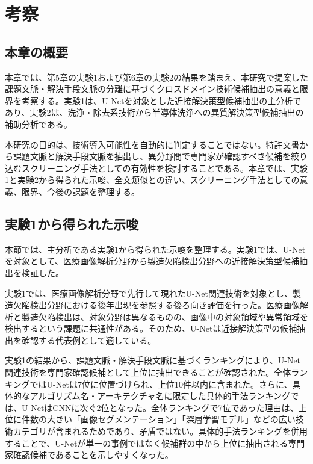 \chapter{考察}

\section{本章の概要}

本章では、第5章の実験1および第6章の実験2の結果を踏まえ、本研究で提案した課題文脈・解決手段文脈の分離に基づくクロスドメイン技術候補抽出の意義と限界を考察する。実験1は、U-Netを対象とした近接解決策型候補抽出の主分析であり、実験2は、洗浄・除去系技術から半導体洗浄への異質解決策型候補抽出の補助分析である。

本研究の目的は、技術導入可能性を自動的に判定することではない。特許文書から課題文脈と解決手段文脈を抽出し、異分野間で専門家が確認すべき候補を絞り込むスクリーニング手法としての有効性を検討することである。本章では、実験1と実験2から得られた示唆、全文類似との違い、スクリーニング手法としての意義、限界、今後の課題を整理する。

\section{実験1から得られた示唆}




本節では、主分析である実験1から得られた示唆を整理する。実験1では、U-Netを対象として、医療画像解析分野から製造欠陥検出分野への近接解決策型候補抽出を検証した。

実験1では、医療画像解析分野で先行して現れたU-Net関連技術を対象とし、製造欠陥検出分野における後年出現を参照する後ろ向き評価を行った。医療画像解析と製造欠陥検出は、対象分野は異なるものの、画像中の対象領域や異常領域を検出するという課題に共通性がある。そのため、U-Netは近接解決策型の候補抽出を確認する代表例として適している。

実験1の結果から、課題文脈・解決手段文脈に基づくランキングにより、U-Net関連技術を専門家確認候補として上位に抽出できることが確認された。全体ランキングではU-Netは7位に位置づけられ、上位10件以内に含まれた。さらに、具体的なアルゴリズム名・アーキテクチャ名に限定した具体的手法ランキングでは、U-NetはCNNに次ぐ2位となった。全体ランキングで7位であった理由は、上位に件数の大きい「画像セグメンテーション」「深層学習モデル」などの広い技術カテゴリが含まれるためであり、矛盾ではない。具体的手法ランキングを併用することで、U-Netが単一の事例ではなく候補群の中から上位に抽出される専門家確認候補であることを示しやすくなった。


